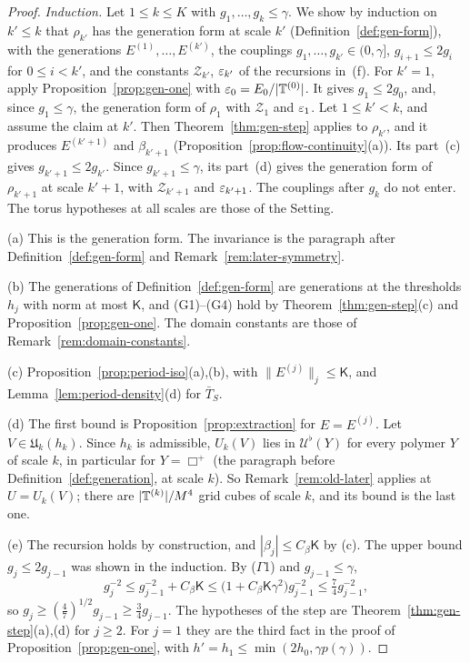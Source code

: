 \begin{proof}
\emph{Induction.} Let $1\le k\le K$ with $g_1,\dots,g_k\le\gamma$. We show by induction on $k'\le k$ that $\rho_{k'}$ has the generation form at scale $k'$ (Definition~\ref{def:gen-form}), with the generations $E^{(1)},\dots,E^{(k')}$, the couplings $g_1,\dots,g_{k'}\in(0,\gamma]$, $g_{i+1}\le2g_i$ for $0\le i<k'$, and the constants $\mathcal Z_{k'}$, $\varepsilon_{k'}$ of the recursions in~(f). For $k'=1$, apply Proposition~\ref{prop:gen-one} with $\varepsilon_0=E_0/|\mathbb T^{(0)}|$. It gives $g_1\le2g_0$, and, since $g_1\le\gamma$, the generation form of $\rho_1$ with $\mathcal Z_1$ and $\varepsilon_1$. Let $1\le k'<k$, and assume the claim at $k'$. Then Theorem~\ref{thm:gen-step} applies to $\rho_{k'}$, and it produces $E^{(k'+1)}$ and $\beta_{k'+1}$ (Proposition~\ref{prop:flow-continuity}(a)). Its part~(c) gives $g_{k'+1}\le2g_{k'}$. Since $g_{k'+1}\le\gamma$, its part~(d) gives the generation form of $\rho_{k'+1}$ at scale $k'+1$, with $\mathcal Z_{k'+1}$ and $\varepsilon_{k'+1}$. The couplings after $g_k$ do not enter. The torus hypotheses at all scales are those of the Setting.

(a) This is the generation form. The invariance is the paragraph after Definition~\ref{def:gen-form} and Remark~\ref{rem:later-symmetry}.

(b) The generations of Definition~\ref{def:gen-form} are generations at the thresholds $h_j$ with norm at most $\mathsf K$, and (G1)--(G4) hold by Theorem~\ref{thm:gen-step}(c) and Proposition~\ref{prop:gen-one}. The domain constants are those of Remark~\ref{rem:domain-constants}.

(c) Proposition~\ref{prop:period-iso}(a),(b), with $\|E^{(j)}\|_j\le\mathsf K$, and Lemma~\ref{lem:period-density}(d) for $\bar T_S$.

(d) The first bound is Proposition~\ref{prop:extraction} for $E=E^{(j)}$. Let $V\in\mathfrak U_k(h_k)$. Since $h_k$ is admissible, $U_k(V)$ lies in $\mathcal U^\flat(Y)$ for every polymer $Y$ of scale $k$, in particular for $Y=\Box^+$ (the paragraph before Definition~\ref{def:generation}, at scale $k$). So Remark~\ref{rem:old-later} applies at $U=U_k(V)$; there are $|\mathbb T^{(k)}|/M^4$ grid cubes of scale $k$, and its bound is the last one.

(e) The recursion holds by construction, and $|\beta_j|\le C_\beta\mathsf K$ by (c). The upper bound $g_j\le2g_{j-1}$ was shown in the induction. By ($\Gamma$1) and $g_{j-1}\le\gamma$,
\[
g_j^{-2}\le g_{j-1}^{-2}+C_\beta\mathsf K\le\big(1+C_\beta\mathsf K\gamma^2\big)g_{j-1}^{-2}\le\tfrac74g_{j-1}^{-2},
\]
so $g_j\ge(\frac47)^{1/2}g_{j-1}\ge\frac34g_{j-1}$. The hypotheses of the step are Theorem~\ref{thm:gen-step}(a),(d) for $j\ge2$. For $j=1$ they are the third fact in the proof of Proposition~\ref{prop:gen-one}, with $h'=h_1\le\min(2h_0,\gamma p(\gamma))$.


\end{proof}
